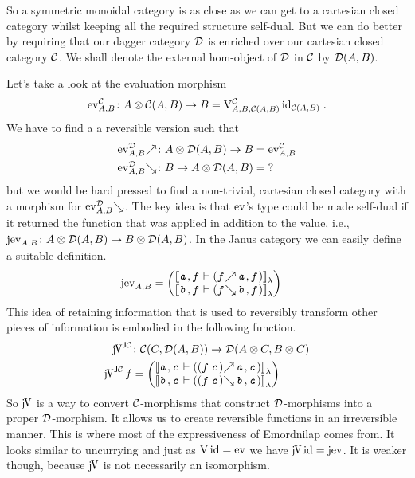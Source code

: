 \documentclass[runningheads,envcountsame]{llncs}
\begin{document}
    So a symmetric monoidal category is as close as we can get to a cartesian closed category whilst keeping all the required structure self-dual. But we can do better by requiring that our dagger category $\mathcal{D}$ is enriched over our cartesian closed category $\mathcal{C}$. We shall denote the external hom-object of $\mathcal{D}$ in $\mathcal{C}$ by $\mathcal{D}(A, B)$.
    
    Let's take a look at the evaluation morphism \[
    \eval[\C]_{A,B}\colon \tensor{A}{\homC{A}{B}} \to B = \uncurry[\C]_{A,B,\homC{A}{B}}\,\id_{\homC{A}{B}}\;.
    \]
    We have to find a a reversible version such that \begin{align*}
        \f{\eval[\D]_{A, B}}&\colon \tensor{A}{\homD{A}{B}} \to B = \eval[\C]_{A,B}\\
        \b{\eval[\D]_{A, B}}&\colon B \to \tensor{A}{\homD{A}{B}} = {?}
    \end{align*} but we would be hard pressed to find a non-trivial, cartesian closed category with a morphism for $\b{\eval[\D]_{A, B}}$. The key idea is that $\eval$'s type could be made self-dual if it returned the function that was applied in addition to the value, i.e., $\jeval_{A,B}\colon \tensor{A}{\homD{A}{B}} \to \tensor{B}{\homD{A}{B}}$. In the Janus category we can easily define a suitable definition. \begin{align*}
        \jeval_{A,B} &= \janus{\semL{\evar{a}, \evar{f} \vdash (\eapp{\f{\evar{f}}}{\evar{a}}, \evar{f})}}
                              {\semL{\evar{b}, \evar{f} \vdash (\eapp{\b{\evar{f}}}{\evar{b}}, \evar{f})}}
    \end{align*} This idea of retaining information that is used to reversibly transform other pieces of information is embodied in the following function.
    \begin{align*}
        \juncurry[\JC] &\colon \homC{C}{\homD{A}{B}} \to \homD{\tensor{A}{C}}{\tensor{B}{C}} \\
        \juncurry[\JC]\,f &= \janus{\semL{\evar{a}, \evar{c} \vdash \epair{\eapp{\f{(\eapp{\evar{f}}{\evar{c}})}}{\evar{a}}}{\evar{c}}}}
                                   {\semL{\evar{b}, \evar{c} \vdash \epair{\eapp{\b{(\eapp{\evar{f}}{\evar{c}})}}{\evar{b}}}{\evar{c}}}}
    \end{align*}
    So $\juncurry$ is a way to convert $\mathcal{C}$-morphisms that construct $\mathcal{D}$-morphisms into a proper $\mathcal{D}$-morphism. It allows us to create reversible functions in an irreversible manner. This is where most of the expressiveness of Emordnilap comes from. It looks similar to uncurrying and just as $\uncurry\,\id = \eval$ we have $\juncurry\,\id = \jeval$. It is weaker though, because $\juncurry$ is not necessarily an isomorphism.
    
\end{document}
